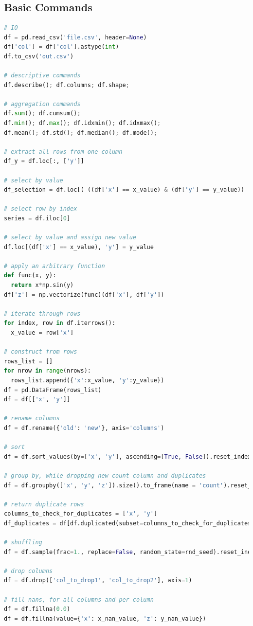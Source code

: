 \chapter{\pandas}
\label{pandas}

\section{Basic Commands}
\label{pandas:basic}

\begin{lstlisting}[language=Python]
# IO
df = pd.read_csv('file.csv', header=None)
df['col'] = df['col'].astype(int)
df.to_csv('out.csv')

# descriptive commands
df.describe(); df.columns; df.shape;

# aggregation commands
df.sum(); df.cumsum();
df.min(); df.max(); df.idxmin(); df.idxmax();
df.mean(); df.std(); df.median(); df.mode();

# extract all rows from one column
df_y = df.loc[:, ['y']]

# select by value
df_selection = df.loc[( ((df['x'] == x_value) & (df['y'] == y_value)) | (df['z'] > z_value))]

# select row by index
series = df.iloc[0]

# select by value and assign new value
df.loc[(df['x'] == x_value), 'y'] = y_value

# apply an arbitrary function
def func(x, y):
  return x*np.sin(y)
df['z'] = np.vectorize(func)(df['x'], df['y'])

# iterate through rows
for index, row in df.iterrows():
  x_value = row['x']

# construct from rows
rows_list = []
for nrow in range(nrows):
  rows_list.append({'x':x_value, 'y':y_value})
df = pd.DataFrame(rows_list)
df = df[['x', 'y']]

# rename columns
df = df.rename({'old': 'new'}, axis='columns')

# sort
df = df.sort_values(by=['x', 'y'], ascending=[True, False]).reset_index(drop=True)

# group by, while dropping new count column and duplicates
df = df.groupby(['x', 'y', 'z']).size().to_frame(name = 'count').reset_index().drop(['count'], axis=1).drop_duplicates()

# return duplicate rows
columns_to_check_for_duplicates = ['x', 'y']
df_duplicates = df[df.duplicated(subset=columns_to_check_for_duplicates, keep=False)]

# shuffling
df = df.sample(frac=1., replace=False, random_state=rnd_seed).reset_index(drop=True)

# drop columns
df = df.drop(['col_to_drop1', 'col_to_drop2'], axis=1)

# fill nans, for all columns and per column 
df = df.fillna(0.0)
df = df.fillna(value={'x': x_nan_value, 'z': y_nan_value})
\end{lstlisting}

